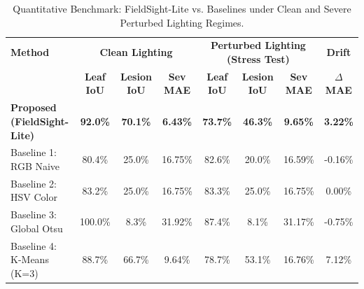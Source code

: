 \begin{table}[htbp]
\centering
\caption{Quantitative Benchmark: FieldSight-Lite vs. Baselines under Clean and Severe Perturbed Lighting Regimes.}
\label{tab:fieldsight_benchmarks}
\small
\begin{tabular}{lcccccc|c}
\hline
\textbf{Method} & \multicolumn{3}{c}{\textbf{Clean Lighting}} & \multicolumn{3}{c}{\textbf{Perturbed Lighting (Stress Test)}} & \textbf{Drift} \\
 & \textbf{Leaf IoU} & \textbf{Lesion IoU} & \textbf{Sev MAE} & \textbf{Leaf IoU} & \textbf{Lesion IoU} & \textbf{Sev MAE} & \textbf{$\Delta$MAE} \\
\hline
\textbf{Proposed (FieldSight-Lite)} & \textbf{92.0\%} & \textbf{70.1\%} & \textbf{6.43\%} & \textbf{73.7\%} & \textbf{46.3\%} & \textbf{9.65\%} & \textbf{3.22\%} \\
Baseline 1: RGB Naive & 80.4\% & 25.0\% & 16.75\% & 82.6\% & 20.0\% & 16.59\% & -0.16\% \\
Baseline 2: HSV Color & 83.2\% & 25.0\% & 16.75\% & 83.3\% & 25.0\% & 16.75\% & 0.00\% \\
Baseline 3: Global Otsu & 100.0\% & 8.3\% & 31.92\% & 87.4\% & 8.1\% & 31.17\% & -0.75\% \\
Baseline 4: K-Means (K=3) & 88.7\% & 66.7\% & 9.64\% & 78.7\% & 53.1\% & 16.76\% & 7.12\% \\
\hline
\end{tabular}
\end{table}